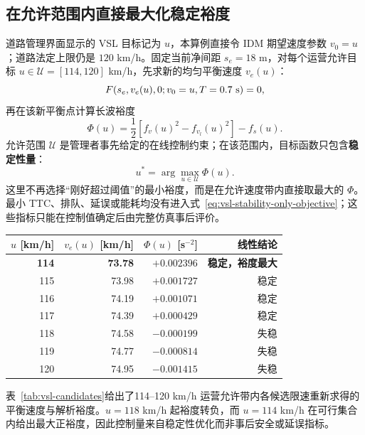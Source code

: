 \documentclass[11pt,a4paper,openany]{book}
\numberwithin{equation}{chapter}
\numberwithin{figure}{chapter}
\numberwithin{table}{chapter}
\newcommand{\tabletext}[2]{%
  \par\smallskip\noindent
  表~\ref{#1}给出了#2
  \par\smallskip
}
\begin{document}
\subsection{在允许范围内直接最大化稳定裕度}

道路管理界面显示的 VSL 目标记为 $u$，本算例直接令 IDM 期望速度参数 $v_0=u$；道路法定上限仍是 $120$ km/h。固定当前净间距 $s_e=18$ m，对每个运营允许目标 $u\in\mathcal U=[114,120]$ km/h，先求新的均匀平衡速度 $v_e(u)$：
\begin{equation}
F\!\left(s_e,v_e(u),0;v_0=u,T=0.7~{\rm s}\right)=0,
\label{eq:vsl-new-equilibrium}
\end{equation}
再在该新平衡点计算长波裕度
\begin{equation}
\Phi(u)=\frac12\left[f_v(u)^2-f_{v_l}(u)^2\right]-f_s(u).
\label{eq:vsl-phi}
\end{equation}
允许范围 $\mathcal U$ 是管理者事先给定的在线控制约束；在该范围内，目标函数只包含\textbf{稳定性量}：
\begin{equation}
u^*=\arg\max_{u\in\mathcal U}\Phi(u).
\label{eq:vsl-stability-only-objective}
\end{equation}
这里不再选择“刚好超过阈值”的最小裕度，而是在允许速度带内直接取最大的 $\Phi$。最小 TTC、排队、延误或能耗均没有进入式~\eqref{eq:vsl-stability-only-objective}；这些指标只能在控制值确定后由完整仿真事后评价。

\begin{center}
\small
{}
\label{tab:vsl-candidates}
\begin{tabular}{rrrr}
\toprule
$u$ [km/h] & $v_e(u)$ [km/h] & $\Phi(u)$ [s$^{-2}$] & 线性结论 \\
\midrule
\textbf{114} & \textbf{73.78} & \textbf{$+0.002396$} & \textbf{稳定，裕度最大} \\
115 & 73.98 & $+0.001727$ & 稳定 \\
116 & 74.19 & $+0.001071$ & 稳定 \\
117 & 74.39 & $+0.000429$ & 稳定 \\
118 & 74.58 & $-0.000199$ & 失稳 \\
119 & 74.77 & $-0.000814$ & 失稳 \\
120 & 74.95 & $-0.001415$ & 失稳 \\
\bottomrule
\end{tabular}
\end{center}
\tabletext{tab:vsl-candidates}{114--120 km/h 运营允许带内各候选限速重新求得的平衡速度与解析裕度。$u=118$ km/h 起裕度转负，而 $u=114$ km/h 在可行集合内给出最大正裕度，因此控制量来自稳定性优化而非事后安全或延误指标。}
\end{document}
